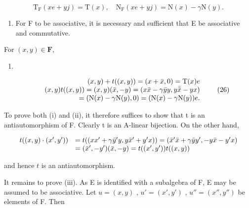 \[
\mathrm{T} _ {\mathrm{F}} (x e + y j) = \mathrm{T} (x), \quad \mathrm{N} _ {\mathrm{F}} (x e + y j) = \mathrm{N} (x) - \gamma \mathrm{N} (y).\tag{24}
\]

\begin{enumerate}
\def\labelenumi{(\roman{enumi})}
\setcounter{enumi}{2}
\tightlist
\item
  For F to be associative, it is necessary and sufficient that E be associative and commutative.
\end{enumerate}

For \((x,y)\in \mathbf{F},\)

\begin{enumerate}
\def\labelenumi{(\arabic{enumi})}
\setcounter{enumi}{24}
\tightlist
\item
\end{enumerate}

\[
\begin{array}{r l r} & & {(x, y) + t ((x, y)) = (x + \bar {x}, 0) = \mathrm{T} (x) e} \\ & & {(x, y) t ((x, y)) = (x, y) (\bar {x}, - y) = (x \bar {x} - \gamma \bar {y} y, y \bar {\bar {x}} - y x)} \\ & & {= (\mathrm{N} (x) - \gamma \mathrm{N} (y), 0) = (\mathrm{N} (x) - \gamma \mathrm{N} (y)) e.} \end{array}\tag{26}
\]

To prove both (i) and (ii), it therefore suffices to show that t is an antiautomorphism of F. Clearly t is an A-linear bijection. On the other hand,

\[
\begin{array}{r l} t ((x, y) \cdot (x ^ {\prime}, y ^ {\prime})) & = t ((x x ^ {\prime} + \gamma \bar {y} ^ {\prime} y, y \bar {x} ^ {\prime} + y ^ {\prime} x)) = (\bar {x} ^ {\prime} \bar {x} + \gamma \bar {y} y ^ {\prime}, - y \bar {x} - y ^ {\prime} x) \\ & = (\bar {x} ^ {\prime}, - y ^ {\prime}) (\bar {x}, - y) = t ((x ^ {\prime}, y ^ {\prime})) t ((x, y)) \end{array}
\]

and hence \(t\) is an antiautomorphism.

It remains to prove (iii). As E is identified with a subalgebra of F, E may be assumed to be associative. Let \(u = (x, y)\) , \(u' = (x', y')\) , \(u'' = (x'', y'')\) be elements of F. Then

